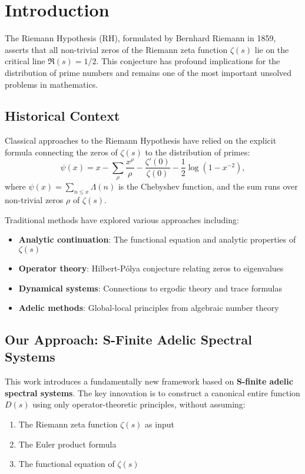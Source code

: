 \section{Introduction}
\label{sec:introduction}

The Riemann Hypothesis (RH), formulated by Bernhard Riemann in 1859, asserts that all non-trivial zeros of the Riemann zeta function $\zeta(s)$ lie on the critical line $\Re(s) = 1/2$. This conjecture has profound implications for the distribution of prime numbers and remains one of the most important unsolved problems in mathematics.

\subsection{Historical Context}

Classical approaches to the Riemann Hypothesis have relied on the explicit formula connecting the zeros of $\zeta(s)$ to the distribution of primes:
\[
\psi(x) = x - \sum_{\rho} \frac{x^\rho}{\rho} - \frac{\zeta'(0)}{\zeta(0)} - \frac{1}{2}\log(1-x^{-2}),
\]
where $\psi(x) = \sum_{n \leq x} \Lambda(n)$ is the Chebyshev function, and the sum runs over non-trivial zeros $\rho$ of $\zeta(s)$.

Traditional methods have explored various approaches including:
\begin{itemize}
\item \textbf{Analytic continuation}: The functional equation and analytic properties of $\zeta(s)$
\item \textbf{Operator theory}: Hilbert-Pólya conjecture relating zeros to eigenvalues
\item \textbf{Dynamical systems}: Connections to ergodic theory and trace formulas
\item \textbf{Adelic methods}: Global-local principles from algebraic number theory
\end{itemize}

\subsection{Our Approach: S-Finite Adelic Spectral Systems}

This work introduces a fundamentally new framework based on \textbf{S-finite adelic spectral systems}. The key innovation is to construct a canonical entire function $D(s)$ using only operator-theoretic principles, without assuming:
\begin{enumerate}
\item The Riemann zeta function $\zeta(s)$ as input
\item The Euler product formula
\item The functional equation of $\zeta(s)$
\end{enumerate}


